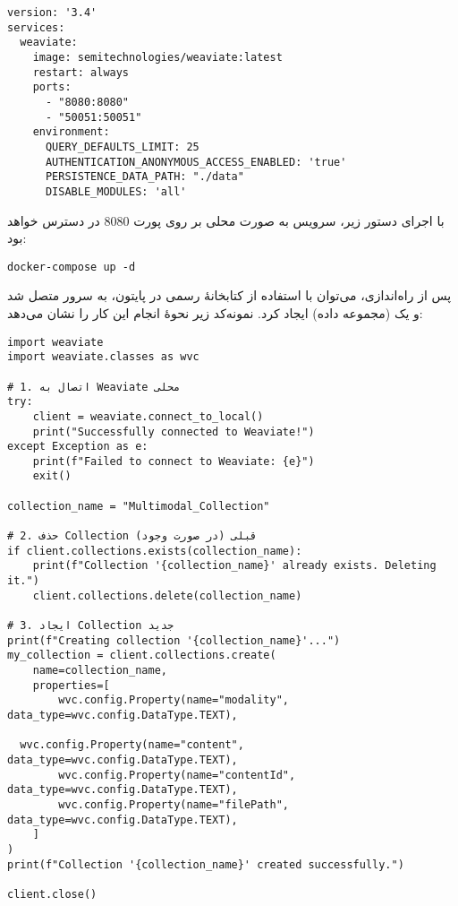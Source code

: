\documentclass{article}
\begin{document}
\begin{latin}
\begin{lstlisting}
version: '3.4'
services:
  weaviate:
    image: semitechnologies/weaviate:latest
    restart: always
    ports:
      - "8080:8080"
      - "50051:50051"
    environment:
      QUERY_DEFAULTS_LIMIT: 25
      AUTHENTICATION_ANONYMOUS_ACCESS_ENABLED: 'true'
      PERSISTENCE_DATA_PATH: "./data"
      DISABLE_MODULES: 'all'
\end{lstlisting}
\end{latin}

با اجرای دستور زیر، سرویس  به صورت محلی بر روی پورت 8080 در دسترس خواهد بود:

\begin{latin}
\begin{lstlisting}
docker-compose up -d
\end{lstlisting}
\end{latin}

پس از راه‌اندازی، می‌توان با استفاده 
از کتابخانهٔ رسمی  در پایتون، به سرور متصل شد و یک  (مجموعه داده) ایجاد کرد.
نمونه‌کد زیر نحوهٔ انجام این کار را نشان می‌دهد:

\begin{latin}
\begin{lstlisting}
import weaviate
import weaviate.classes as wvc

# 1. اتصال به Weaviate محلی
try:
    client = weaviate.connect_to_local()
    print("Successfully connected to Weaviate!")
except Exception as e:
    print(f"Failed to connect to Weaviate: {e}")
    exit()

collection_name = "Multimodal_Collection"

# 2. حذف Collection قبلی (در صورت وجود)
if client.collections.exists(collection_name):
    print(f"Collection '{collection_name}' already exists. Deleting it.")
    client.collections.delete(collection_name)

# 3. ایجاد Collection جدید
print(f"Creating collection '{collection_name}'...")
my_collection = client.collections.create(
    name=collection_name,
    properties=[
        wvc.config.Property(name="modality", data_type=wvc.config.DataType.TEXT),
      
  wvc.config.Property(name="content", data_type=wvc.config.DataType.TEXT),
        wvc.config.Property(name="contentId", data_type=wvc.config.DataType.TEXT),
        wvc.config.Property(name="filePath", data_type=wvc.config.DataType.TEXT),
    ]
)
print(f"Collection '{collection_name}' created successfully.")

client.close()
\end{lstlisting}
\end{latin}
\end{document}
